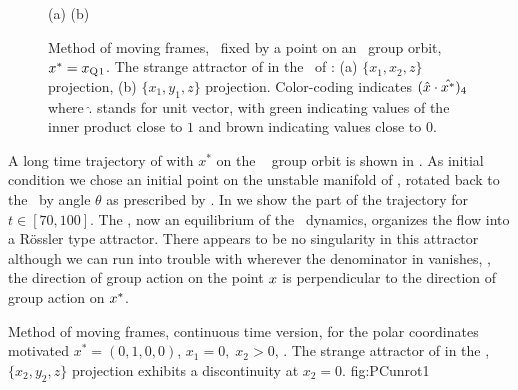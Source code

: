 %
\begin{figure}[ht]
\begin{center}
(a) %
(b) %
\end{center}
\caption{
Method of moving frames, \slice\ fixed by a point on an
\reqv\ group orbit, $x^{*} = x_{\mathrm{Q}_{}1}$. The strange
attractor of  in the \reducedsp\
of :
(a) $\{x_1,x_2,z\}$ projection,
(b) $\{x_1,y_1,z\}$ projection.
Color-coding indicates $(\hat{x} \cdot \hat{x^{*}})_4$
where $\hat{.}$ stands for unit vector, with green indicating values
of the inner product close to $1$ and brown indicating values
close to $0$.
    }
\label{fig:CLEpcSect}
\end{figure}
%
A long time trajectory of  with
$x^*$ on the \reqv\  group orbit is shown in
.
As initial condition
we chose an initial point on the unstable manifold
of , rotated back to the \slice\ by angle $\theta$ as
prescribed by . In  we
show the part of the trajectory for $t\in\left[70,100\right]$.
The \reqv, now an equilibrium of the
\reducedsp\ dynamics, organizes the flow into a R\"ossler type
attractor. There appears to be no singularity in this
attractor although we can run into trouble with
 wherever the denominator in
 vanishes, \ie, the direction of group
action on the point $x$ is perpendicular to the direction
of group action on $x^*$.


{}{
Method of moving frames, continuous time version, for the
polar coordinates motivated $x^{*}=(0,1,0,0)$,
$x_1=0,\;x_2>0$, \slice. The strange attractor of
 in the \reducedsp,
$\{x_2,y_2,z\}$ projection exhibits a discontinuity at
$x_2=0$.
}
{fig:PCunrot1}

